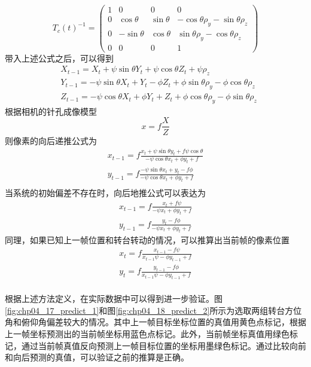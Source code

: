 \begin{equation}
T_c(t)^{-1} =\begin{pmatrix} 1 & 0 & 0 & 0 \\ 0 & \cos \theta & \sin \theta & -\cos \theta \rho_y -\sin \theta \rho_z \\0 & -\sin \theta & \cos \theta & \sin\theta \rho_y-\cos \theta \rho_z \\ 0 & 0 & 0 & 1 \end{pmatrix}
\end{equation}
带入上述公式之后，可以得到
\begin{align}
&X_{t-1} = X_t + \psi \sin \theta Y_t + \psi \cos \theta Z_t + \psi \rho_z \\
&Y_{t-1} = -\psi \sin \theta X_t +  Y_ t - \phi Z_t + \phi \sin \theta \rho_y - \phi \cos \theta \rho_z \\
&Z_{t-1}  = -\psi \cos \theta X_t + \phi  Y_ t + Z_t + \phi \cos \theta \rho_y - \phi \sin \theta \rho_z
\end{align}
根据相机的针孔成像模型
\begin{equation}
x = f \frac{X}{Z}
\end{equation}
则像素的向后递推公式为
\begin{align}
x_{t-1} = f\frac{x_t+\psi \sin \theta y_t + f\psi \cos \theta}{- \psi \cos \theta x_t + \phi y_t + f} \\
y_{t-1} = f\frac{-\psi \sin \theta x_t +y_t -f\phi}{- \psi \cos \theta x_t + \phi y_t + f} \\
\end{align}
当系统的初始偏差不存在时，向后地推公式可以表达为
\begin{align}
\label{eq:curr_predict_prev]}
x_{t-1} = f\frac{x_t + f\psi }{- \psi  x_t  + \phi y_t + f} \\
y_{t-1} = f\frac{y_t -f\phi}{- \psi  x_t + \phi y_t + f}
\end{align}
同理，如果已知上一帧位置和转台转动的情况，可以推算出当前帧的像素位置
\begin{align}
\label{eq:prev_predict_curr}
x_{t} = f\frac{x_{t-1} - f\psi }{x_{t-1}  \psi  - \phi y_{t-1} + f} \\
y_{t} = f\frac{y_{t-1} -f\phi}{  x_{t-1} \psi - \phi y_{t-1} + f} \\
\end{align}

根据上述方法定义，在实际数据中可以得到进一步验证。图\ref{fig:chp04_17_predict_1}和图\ref{fig:chp04_18_predict_2}所示为选取两组转台方位角和俯仰角偏差较大的情况。其中上一帧目标坐标位置的真值用黄色点标记，根据上一帧坐标预测出的当前帧坐标用蓝色点标记。此外，当前帧坐标真值用绿色标记，通过当前帧真值反向预测上一帧目标位置的坐标用墨绿色标记。通过比较向前和向后预测的真值，可以验证之前的推算是正确。

